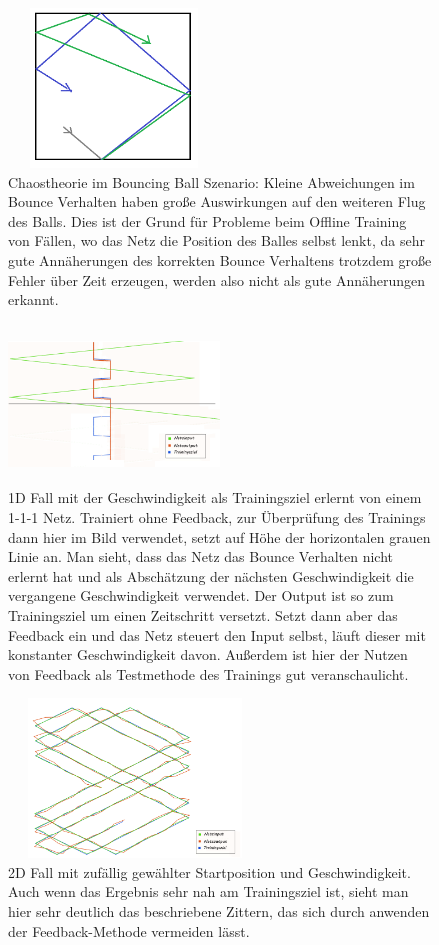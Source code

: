 \begin{figure}
	\centering
	\includegraphics[width=0.5\textwidth, height=160px]{pics/chaos.png}	
	\caption{Chaostheorie im Bouncing Ball Szenario: Kleine Abweichungen im Bounce Verhalten haben große Auswirkungen auf den weiteren Flug des Balls. Dies ist der Grund für Probleme beim Offline Training von Fällen, wo das Netz die Position des Balles selbst lenkt, da sehr gute Annäherungen des korrekten Bounce Verhaltens trotzdem große Fehler über Zeit erzeugen, werden also nicht als gute Annäherungen erkannt.}
	\label{img:chaos}
\end{figure}
\begin{figure}
	\centering
	\includegraphics[width=0.5\textwidth, height=160px]{pics/1D1.png}	
	\caption{1D Fall mit der Geschwindigkeit als Trainingsziel erlernt von einem 1-1-1 Netz. Trainiert ohne Feedback, zur Überprüfung des Trainings dann hier im Bild verwendet, setzt auf Höhe der horizontalen grauen Linie an. Man sieht, dass das Netz das Bounce Verhalten nicht erlernt hat und als Abschätzung der nächsten Geschwindigkeit die vergangene Geschwindigkeit verwendet. Der Output ist so zum Trainingsziel um einen Zeitschritt versetzt. Setzt dann aber das Feedback ein und das Netz steuert den Input selbst, läuft dieser mit konstanter Geschwindigkeit davon. Außerdem ist hier der Nutzen von Feedback als Testmethode des Trainings gut veranschaulicht.}
	 \label{img:1d1}
\end{figure}
\begin{figure}
	\centering
	\includegraphics[width=0.6\textwidth, height=160px]{pics/fb.png}	
	\caption{2D Fall mit zufällig gewählter Startposition und Geschwindigkeit. Auch wenn das Ergebnis sehr nah am Trainingsziel ist, sieht man hier sehr deutlich das beschriebene Zittern, das sich durch anwenden der Feedback-Methode vermeiden lässt.}
	\label{img:fb}
\end{figure}
